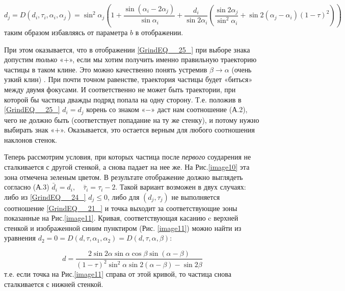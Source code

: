 \documentclass[a4paper]{article}
\begin{document}
\begin{equation} \label{GrindEQ__25_1} {d_j} = D\left(d_{i} ,\tau _{i} ,\alpha _{i} ,\alpha _{j} \right)={\sin ^2}{\alpha _j}\left( {1 + \frac{{\sin \left( {{\alpha _i} - 2{\alpha _j}} \right)}}{{\sin {\alpha _i}}} + \frac{{{d_i}}}{{\sin 2{\alpha _i}}}\left( {\frac{{\sin 2{\alpha _j}}}{{{{\sin }^2}{\alpha _i}}} + \sin 2\left( {{\alpha _j} - {\alpha _i}} \right){{\left( {1 - \tau } \right)}^2}} \right)} \right)\end{equation}
таким образом избавляясь от параметра $b$ в отображении.

При этом оказывается, что в отображении \eqref{GrindEQ__25_} при выборе знака допустим \textit{только} «+», если мы хотим получить именно правильную траекторию частицы в таком клине. Это можно качественно понять устремив $\beta \to \alpha $ (очень узкий клин) . При  почти точном равенстве, траектория частицы будет «биться» между двумя фокусами. И соответственно не может быть траектории, при которой бы частица дважды подряд попала на одну сторону. Т.е. положив в \eqref{GrindEQ__25_} $d_{i} =d_{j} $ корень со знаком «$-$» даст нам соотношение (А.2), чего не должно быть (соответствует попадание на ту же стенку),  и потому нужно выбирать знак «$+$». Оказывается, это остается верным для любого соотношения наклонов стенок.

Теперь рассмотрим условия, при которых частица после \textit{первого }соударения не сталкивается с другой стенкой, а снова падает на нее же. На Рис.\ref{image10} эта зона отмечена зеленым цветом. В результате отображение должно выглядеть согласно (А.3) $\bar{d}_{i} =d_{i} ,\quad \bar{\tau }_{i} =\tau _{i} -2$. Такой вариант возможен в двух случаях: либо из \eqref{GrindEQ__24_} $d_{j} \le 0$, либо для $\left(d_{j} ,\tau _{j} \right)$ не выполняется соотношение \eqref{GrindEQ__21_} и точка выходит за соответствующие зоны показанные на Рис.\ref{image11}. Кривая, соответствующая касанию c {верхней} стенкой и изображенной синим пунктиром (Рис. \ref{image11}) можно найти из уравнения $d_{2} =0=D\left(d ,\tau ,\alpha _{1} ,\alpha _{2}\right)=D\left(d ,\tau ,\alpha ,\beta \right)$:

\begin{equation} \label{GrindEQ__26_1}d=\frac{2 \sin 2 \alpha  \sin \alpha \cos \beta \sin (\alpha -\beta )}{(1-\tau )^2 \sin ^2\alpha  \sin 2 (\alpha -\beta )-\sin 2 \beta }\end{equation}
т.е. если точка на Рис.\ref{image11} справа от этой кривой, то частица снова сталкивается с нижней стенкой.
\end{document}
